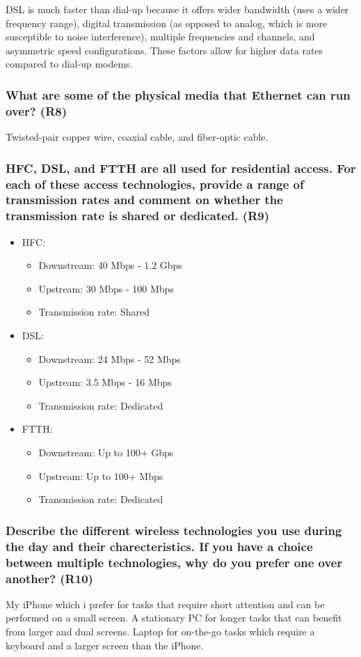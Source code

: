 DSL is much faster than dial-up because it offers wider bandwidth (uses a wider frequency range), digital transmission (as opposed to analog, which is more susceptible to noise interference), multiple frequencies and channels, and asymmetric speed configurations. These factors allow for higher data rates compared to dial-up modems.


\subsubsection{What are some of the physical media that Ethernet can run over? (R8)}
Twisted-pair copper wire, coaxial cable, and fiber-optic cable.


\subsubsection{HFC, DSL, and FTTH are all used for residential access. For each of these access technologies, provide a range of transmission rates and comment on whether the transmission rate is shared or dedicated. (R9)}
\begin{itemize}
    \item HFC: \begin{itemize}
        \item Downstream: 40 Mbps - 1.2 Gbps
        \item Upstream: 30 Mbps - 100 Mbps
        \item Transmission rate: Shared
        \end{itemize}
    \item DSL: \begin{itemize}
        \item Downstream: 24 Mbps - 52 Mbps
        \item Upstream: 3.5 Mbps - 16 Mbps
        \item Transmission rate: Dedicated
        \end{itemize}
    \item FTTH: \begin{itemize}
        \item Downstream: Up to 100+ Gbps
        \item Upstream: Up to 100+ Mbps
        \item Transmission rate: Dedicated
        \end{itemize}
\end{itemize}


\subsubsection{Describe the different wireless technologies you use during the day and their charecteristics. If you have a choice between multiple technologies, why do you prefer one over another? (R10)}
My iPhone which i prefer for tasks that require short attention and can be performed on a small screen. A stationary PC for longer tasks that can benefit from larger and dual screens. Laptop for on-the-go tasks which require a keyboard and a larger screen than the iPhone. 